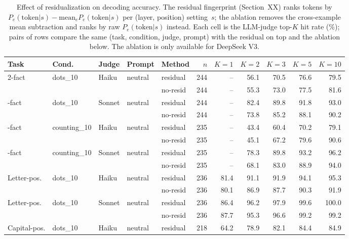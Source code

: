 \begin{table}[h]
\centering
\small
\caption{Effect of residualization on decoding accuracy. The residual fingerprint (Section~XX) ranks tokens by $P_e(\text{token}|s) - \text{mean}_e P_e(\text{token}|s)$ per (layer, position) setting~$s$; the ablation removes the cross-example mean subtraction and ranks by raw $P_e(\text{token}|s)$ instead. Each cell is the LLM-judge top-$K$ hit rate (\%); pairs of rows compare the same (task, condition, judge, prompt) with the residual on top and the ablation below. The ablation is only available for DeepSeek V3.}
\label{tab:residual_ablation}
\begin{tabular}{l l l l l r r r r r r}
\toprule
Task & Cond. & Judge & Prompt & Method & $n$ & $K{=}1$ & $K{=}2$ & $K{=}3$ & $K{=}5$ & $K{=}10$ \\
\midrule
2-fact & dots\_10 & Haiku & neutral & residual    & 244 & -- & 56.1 & 70.5 & 76.6 & 79.5 \\
  &     &     &     & no-resid    & 244 & -- & 55.3 & 73.0 & 77.5 & 81.6 \\
\addlinespace[2pt]
2-fact & dots\_10 & Sonnet & neutral & residual    & 244 & -- & 82.4 & 89.8 & 91.8 & 93.0 \\
  &     &     &     & no-resid    & 244 & -- & 73.8 & 85.2 & 88.1 & 90.2 \\
\addlinespace[2pt]
2-fact & counting\_10 & Haiku & neutral & residual    & 235 & -- & 43.4 & 60.4 & 70.2 & 79.1 \\
  &     &     &     & no-resid    & 235 & -- & 45.1 & 67.2 & 79.6 & 90.6 \\
\addlinespace[2pt]
2-fact & counting\_10 & Sonnet & neutral & residual    & 235 & -- & 78.3 & 89.8 & 93.2 & 96.2 \\
  &     &     &     & no-resid    & 235 & -- & 68.1 & 83.0 & 88.9 & 94.0 \\
\addlinespace[2pt]
Letter-pos. & dots\_10 & Haiku & neutral & residual    & 236 & 81.4 & 91.1 & 91.9 & 94.1 & 95.3 \\
  &     &     &     & no-resid    & 236 & 80.1 & 86.9 & 87.7 & 90.3 & 91.9 \\
\addlinespace[2pt]
Letter-pos. & dots\_10 & Sonnet & neutral & residual    & 236 & 86.4 & 96.2 & 97.9 & 99.6 & 100.0 \\
  &     &     &     & no-resid    & 236 & 87.7 & 95.3 & 96.6 & 99.2 & 99.2 \\
\addlinespace[2pt]
Capital-pos. & dots\_10 & Haiku & neutral & residual    & 218 & 64.2 & 78.9 & 82.1 & 84.4 & 84.9 \\

\end{tabular}
\end{table}

